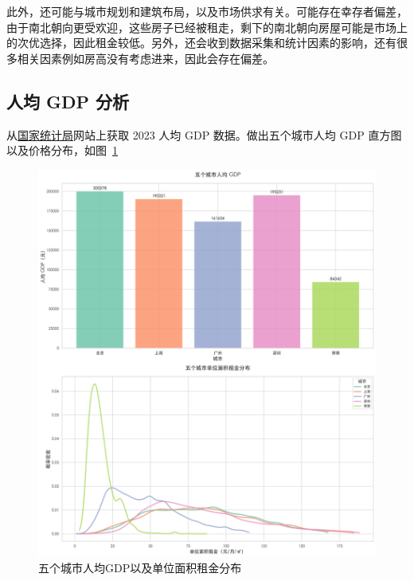 此外，还可能与城市规划和建筑布局，以及市场供求有关。可能存在幸存者偏差，由于南北朝向更受欢迎，这些房子已经被租走，剩下的南北朝向房屋可能是市场上的次优选择，因此租金较低。另外，还会收到数据采集和统计因素的影响，还有很多相关因素例如房高没有考虑进来，因此会存在偏差。

\subsection{人均 GDP 分析}
从\href{https://data.stats.gov.cn/index.htm}{国家统计局}网站上获取 2023 人均 GDP 数据。做出五个城市人均 GDP 直方图以及价格分布，如图~\ref{fig:gdp_bar_chart}
\begin{figure}[htbp]
    \centering
    \includegraphics[width=0.7\linewidth]{../../figure/gdp_unit_price_chart.png}
    \caption{五个城市人均GDP以及单位面积租金分布}
    \label{fig:gdp_bar_chart}
\end{figure}

